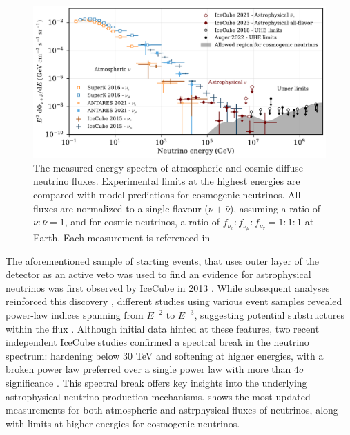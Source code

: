 \begin{figure}[h!]
    \caption[The measured energy spectra of atmospheric and cosmic diffuse neutrino fluxes]{The measured energy spectra of atmospheric and cosmic diffuse neutrino fluxes. Experimental limits at the highest energies are compared with model predictions for cosmogenic neutrinos. All fluxes are normalized to a single flavour ($\nu + \bar{\nu}$), assuming a ratio of $\nu : \bar{\nu} = 1$, and for cosmic neutrinos, a ratio of $f_{\nu_e} : f_{\nu_\mu} : f_{\nu_\tau} = 1 : 1 : 1$ at Earth. Each measurement is referenced in \cite{PDG_2024}}
    \includegraphics{./figures/nu_he/neutrino_spectrum_wide_231010.pdf}
\end{figure}
The aforementioned sample of starting events, that uses outer layer of the detector as an active veto was used to find an evidence for astrophysical neutrinos was first observed by IceCube in 2013 . While subsequent analyses reinforced this discovery , different studies using various event samples revealed power-law indices spanning from \( E^{-2} \) to \( E^{-3} \), suggesting potential substructures within the flux . Although initial data hinted at these features, two recent independent IceCube studies confirmed a spectral break in the neutrino spectrum: hardening below 30 TeV and softening at higher energies, with a broken power law preferred over a single power law with more than \( 4\sigma \) significance . This spectral break offers key insights into the underlying astrophysical neutrino production mechanisms.  shows the most updated measurements for both atmospheric and astrphysical fluxes of neutrinos, along with limits at higher energies for cosmogenic neutrinos. 


